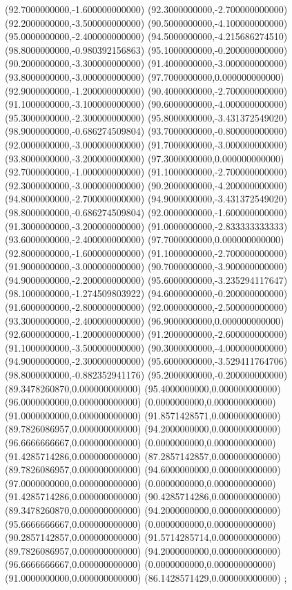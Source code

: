 {(92.7000000000,-1.600000000000)
(92.3000000000,-2.700000000000)
(92.2000000000,-3.500000000000)
(90.5000000000,-4.100000000000)
(95.0000000000,-2.400000000000)
(94.5000000000,-4.215686274510)
(98.8000000000,-0.980392156863)
(95.1000000000,-0.200000000000)
(90.2000000000,-3.300000000000)
(91.4000000000,-3.000000000000)
(93.8000000000,-3.000000000000)
(97.7000000000,0.000000000000)
(92.9000000000,-1.200000000000)
(90.4000000000,-2.700000000000)
(91.1000000000,-3.100000000000)
(90.6000000000,-4.000000000000)
(95.3000000000,-2.300000000000)
(95.8000000000,-3.431372549020)
(98.9000000000,-0.686274509804)
(93.7000000000,-0.800000000000)
(92.0000000000,-3.000000000000)
(91.7000000000,-3.000000000000)
(93.8000000000,-3.200000000000)
(97.3000000000,0.000000000000)
(92.7000000000,-1.000000000000)
(91.1000000000,-2.700000000000)
(92.3000000000,-3.000000000000)
(90.2000000000,-4.200000000000)
(94.8000000000,-2.700000000000)
(94.9000000000,-3.431372549020)
(98.8000000000,-0.686274509804)
(92.0000000000,-1.600000000000)
(91.3000000000,-3.200000000000)
(91.0000000000,-2.833333333333)
(93.6000000000,-2.400000000000)
(97.7000000000,0.000000000000)
(92.8000000000,-1.600000000000)
(91.1000000000,-2.700000000000)
(91.9000000000,-3.000000000000)
(90.7000000000,-3.900000000000)
(94.9000000000,-2.200000000000)
(95.6000000000,-3.235294117647)
(98.1000000000,-1.274509803922)
(94.6000000000,-0.200000000000)
(91.6000000000,-2.800000000000)
(92.0000000000,-2.500000000000)
(93.3000000000,-2.400000000000)
(96.9000000000,0.000000000000)
(92.6000000000,-1.200000000000)
(91.2000000000,-2.600000000000)
(91.1000000000,-3.500000000000)
(90.3000000000,-4.000000000000)
(94.9000000000,-2.300000000000)
(95.6000000000,-3.529411764706)
(98.8000000000,-0.882352941176)
(95.2000000000,-0.200000000000)
(89.3478260870,0.000000000000)
(95.4000000000,0.000000000000)
(96.0000000000,0.000000000000)
(0.0000000000,0.000000000000)
(91.0000000000,0.000000000000)
(91.8571428571,0.000000000000)
(89.7826086957,0.000000000000)
(94.2000000000,0.000000000000)
(96.6666666667,0.000000000000)
(0.0000000000,0.000000000000)
(91.4285714286,0.000000000000)
(87.2857142857,0.000000000000)
(89.7826086957,0.000000000000)
(94.6000000000,0.000000000000)
(97.0000000000,0.000000000000)
(0.0000000000,0.000000000000)
(91.4285714286,0.000000000000)
(90.4285714286,0.000000000000)
(89.3478260870,0.000000000000)
(94.2000000000,0.000000000000)
(95.6666666667,0.000000000000)
(0.0000000000,0.000000000000)
(90.2857142857,0.000000000000)
(91.5714285714,0.000000000000)
(89.7826086957,0.000000000000)
(94.2000000000,0.000000000000)
(96.6666666667,0.000000000000)
(0.0000000000,0.000000000000)
(91.0000000000,0.000000000000)
(86.1428571429,0.000000000000)
};
